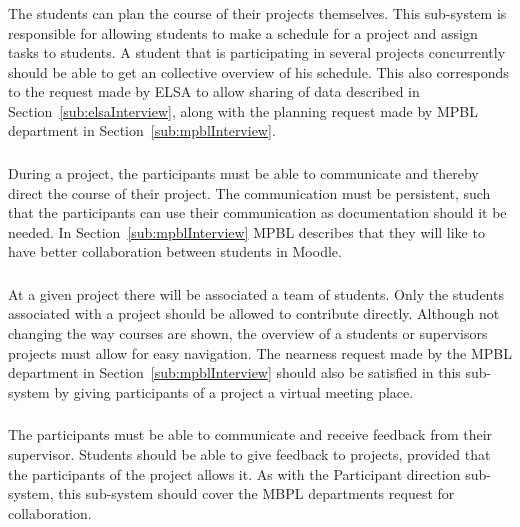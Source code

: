 \subsubsection{\timelinegroup{}} %
The students can plan the course of their projects themselves.
This sub-system is responsible for allowing students to make a schedule for a project and assign tasks to students.
A student that is participating in several projects concurrently should be able to get an collective overview of his schedule.
This also corresponds to the request made by ELSA to allow sharing of data described in Section~\ref{sub:elsaInterview}, along with the planning request made by MPBL department in Section~\ref{sub:mpblInterview}.

\subsubsection{\blackboardgroup{}} %
During a project, the participants must be able to communicate and thereby direct the course of their project.
The communication must be persistent, such that the participants can use their communication as documentation should it be needed.
In Section~\ref{sub:mpblInterview} MPBL describes that they will like to have better collaboration between students in Moodle.

\subsubsection{\administrationgroup{}} %
At a given project there will be associated a team of students.
Only the students associated with a project should be allowed to contribute directly.
Although not changing the way courses are shown, the overview of a students or supervisors projects must allow for easy navigation.
The nearness request made by the MPBL department in Section~\ref{sub:mpblInterview} should also be satisfied in this sub-system by giving participants of a project a virtual meeting place.

\subsubsection{\supervisorgroup{}} %
The participants must be able to communicate and receive feedback from their supervisor.
Students should be able to give feedback to projects, provided that the participants of the project allows it.
As with the Participant direction sub-system, this sub-system should cover the MBPL departments request for collaboration.


